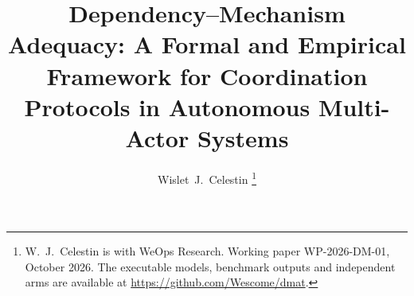 \documentclass[journal,twoside]{IEEEtran}
\theoremstyle{plain}
\theoremstyle{definition}
\theoremstyle{remark}
\begin{document}
\title{Dependency--Mechanism Adequacy: A Formal and Empirical Framework for Coordination Protocols in Autonomous Multi-Actor Systems}

\author{Wislet~J.~Celestin%
\thanks{W.~J.~Celestin is with WeOps Research. Working paper WP-2026-DM-01, October 2026. The executable models, benchmark outputs and independent arms are available at \url{https://github.com/Wescome/dmat}.}}

\maketitle



















\appendices




\end{document}
